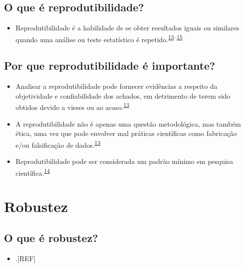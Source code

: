 \documentclass[
  a4paper,
]{book}
\providecommand{\tightlist}{%
  \setlength{\itemsep}{0pt}\setlength{\parskip}{0pt}}
\begin{document}
\hypertarget{o-que-uxe9-reprodutibilidade}{%
\subsection{O que é reprodutibilidade?}\label{o-que-uxe9-reprodutibilidade}}

\begin{itemize}
\tightlist
\item
  Reprodutibilidade é a habilidade de se obter resultados iguais ou similares quando uma análise ou teste estatístico é repetido.\textsuperscript{\protect\hyperlink{ref-resnik2016}{13}--\protect\hyperlink{ref-mair2016}{15}}
\end{itemize}

\hypertarget{por-que-reprodutibilidade-uxe9-importante}{%
\subsection{Por que reprodutibilidade é importante?}\label{por-que-reprodutibilidade-uxe9-importante}}

\begin{itemize}
\item
  Analisar a reprodutibilidade pode fornecer evidências a respeito da objetividade e confiabilidade dos achados, em detrimento de terem sido obtidos devido a vieses ou ao acaso.\textsuperscript{\protect\hyperlink{ref-resnik2016}{13}}
\item
  A reprodutibilidade não é apenas uma questão metodológica, mas também ética, uma vez que pode envolver mal práticas científicas como fabricação e/ou falsificação de dados.\textsuperscript{\protect\hyperlink{ref-resnik2016}{13}}
\item
  Reprodutibilidade pode ser considerada um padrão mínimo em pesquisa científica.\textsuperscript{\protect\hyperlink{ref-hofner2015}{14}}
\end{itemize}

\hypertarget{robustez}{%
\section{Robustez}\label{robustez}}

\hypertarget{o-que-uxe9-robustez}{%
\subsection{O que é robustez?}\label{o-que-uxe9-robustez}}

\begin{itemize}
\tightlist
\item
  .{[}REF{]}
\end{itemize}
\end{document}

